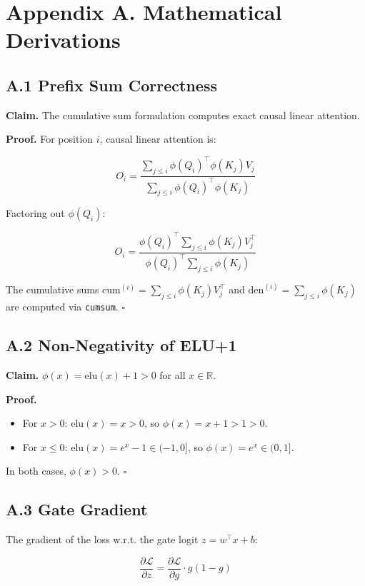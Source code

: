 
\section{Appendix A. Mathematical Derivations}

\subsection{A.1 Prefix Sum Correctness}

\textbf{Claim.} The cumulative sum formulation computes exact causal linear 
attention.

\textbf{Proof.} For position $i$, causal linear attention is:

\[
O_i = \frac{\sum_{j \le i} \phi(Q_i)^\top \phi(K_j) V_j}{\sum_{j \le i} \phi(Q_i)^\top \phi(K_j)}
\]

Factoring out $\phi(Q_i)$:

\[
O_i = \frac{\phi(Q_i)^\top \sum_{j \le i} \phi(K_j) V_j^\top}{\phi(Q_i)^\top \sum_{j \le i} \phi(K_j)}
\]

The cumulative sums $\text{cum}^{(i)} = \sum_{j \le i} \phi(K_j) V_j^\top$ 
and $\text{den}^{(i)} = \sum_{j \le i} \phi(K_j)$ are computed via \texttt{cumsum}. 
$\square$

\subsection{A.2 Non-Negativity of ELU+1}

\textbf{Claim.} $\phi(x) = \mathrm{elu}(x) + 1 > 0$ for all $x \in \mathbb{R}$.

\textbf{Proof.} 

\begin{itemize}
\item For $x > 0$: $\mathrm{elu}(x) = x > 0$, so $\phi(x) = x + 1 > 1 > 0$.
\item For $x \le 0$: $\mathrm{elu}(x) = e^x - 1 \in (-1, 0]$, so
  $\phi(x) = e^x \in (0, 1]$.

\end{itemize}
In both cases, $\phi(x) > 0$. $\square$

\subsection{A.3 Gate Gradient}

The gradient of the loss w.r.t. the gate logit $z = w^\top x + b$:

\[
\frac{\partial \mathcal{L}}{\partial z} = \frac{\partial \mathcal{L}}{\partial g} \cdot g(1 - g)
\]

